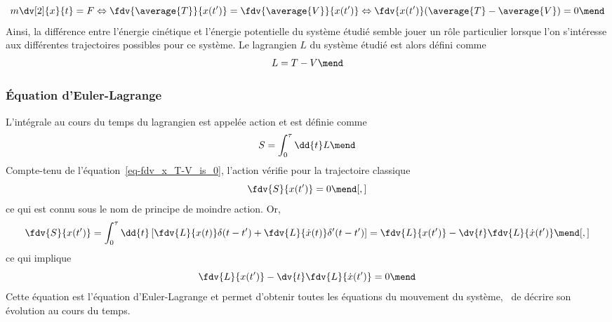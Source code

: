 \begin{equation}
m\dv[2]{x}{t} = F
\Leftrightarrow
\fdv{\average{T}}{x(t')} = \fdv{\average{V}}{x(t')}
\Leftrightarrow
\fdv{x(t')}(\average{T}-\average{V}) = 0 \label{eq-fdv_x_T-V_is_0}
\mend
\end{equation}
Ainsi, la différence entre l'énergie cinétique et l'énergie potentielle du système étudié semble jouer un rôle particulier lorsque l'on s'intéresse aux différentes trajectoires possibles pour ce système. Le lagrangien $L$ du système étudié est alors défini comme
\begin{equation}
L = T-V
\mend
\end{equation}
\subsubsection{Équation d'Euler-Lagrange}\label{chapter-MS-MSSM-section-formalisme-subsec-into_lagrangien-subsubsec-euler-lagrange}
L'intégrale au cours du temps du lagrangien est appelée action et est définie comme
\begin{equation}
S = \int_0^\tau\dd{t}L
\mend
\end{equation}
Compte-tenu de l'équation~\eqref{eq-fdv_x_T-V_is_0}, l'action vérifie pour la trajectoire classique
\begin{equation}
\fdv{S}{x(t')}=0
\mend[,]
\end{equation}
ce qui est connu sous le nom de principe de moindre action. Or,
\begin{equation}
\fdv{S}{x(t')}
= \int_0^\tau\dd{t} \left[ \fdv{L}{x(t)}\delta(t-t') + \fdv{L}{\dot{x}(t)}\delta'(t-t')\right]
= \fdv{L}{x(t')} - \dv{t}\fdv{L}{\dot{x}(t')}
\mend[,]
\end{equation}
ce qui implique
\begin{equation}
\fdv{L}{x(t')} - \dv{t}\fdv{L}{\dot{x}(t')} = 0
\mend
\end{equation}
Cette équation est l'équation d'Euler-Lagrange et permet d'obtenir toutes les équations du mouvement du système, \ie\ de décrire son évolution au cours du temps.

